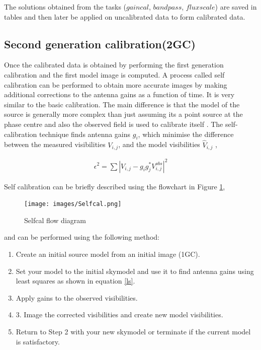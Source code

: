 The solutions obtained from the tasks ($\textit{gaincal}$, $\textit{bandpass}$, $\textit{fluxscale}$) are saved in tables and then later be applied on uncalibrated data 
to form calibrated data.

\subsection{Second generation calibration(2GC)}

Once the calibrated data is obtained by performing the first generation calibration and the first model image is computed. A process called self calibration can be performed to obtain more accurate images by making additional corrections to the antenna gains as a function of time. It is very similar to the basic calibration. The main difference is that the model of the source is generally more complex than just assuming its a point source at the phase centre and also the observed field is used to calibrate itself \citep{wieringa1992investigation}. The self-calibration technique finds antenna gains $g_i$, which minimise the difference between the measured visibilities $V_{i,j}$, and the model visibilities $\hat{V}_{i,j}$ \citep{grobler2016calibration}, 

\begin{align}
\epsilon^2 = \sum |V_{i,j}-g_i g_j^* V^{obs}_{i,j}|^2
\label{ls}
\end{align}

Self calibration can be briefly described using the flowchart in Figure \ref{self},
\begin{figure}[H]
  \centering
    \texttt{[image: images/Selfcal.png]}
    \caption{Selfcal flow diagram} 
    \label{self} 
\end{figure}

and can be performed using the following method:
\begin{enumerate}
\item Create an initial source model from an initial image (1GC).
\item Set your model to the initial skymodel and use it to find antenna gains using least squares as shown in equation \ref{ls}.
\item Apply gains to the observed visibilities.
\item 3. Image the corrected visibilities and create new model visibilities. 
\item Return to Step 2 with your new skymodel or terminate if the current model is satisfactory.
\end{enumerate}
